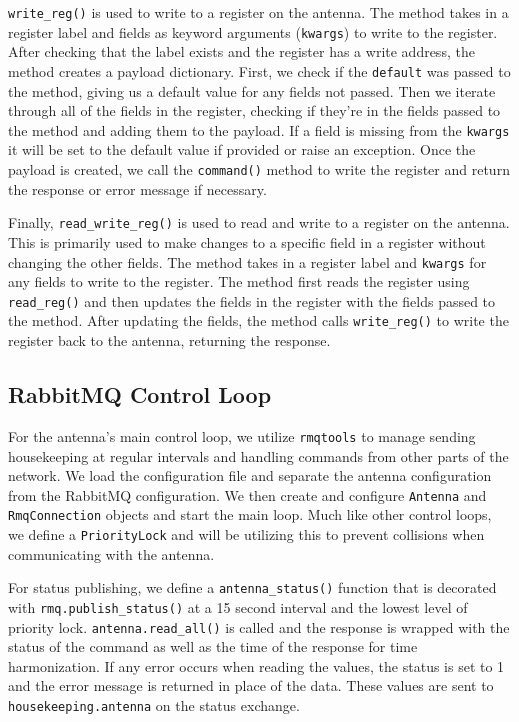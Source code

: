 \texttt{write\_reg()} is used to write to a register on the antenna.
The method takes in a register label and fields as keyword arguments (\texttt{kwargs}) to write to the register.
After checking that the label exists and the register has a write address, the method creates a payload dictionary. 
First, we check if the \texttt{default}  was passed to the method, giving us a default value for any fields not passed.
Then we iterate through all of the fields in the register, checking if they're in the fields passed to the method and adding them to the payload.
If a field is missing from the \texttt{kwargs} it will be set to the default value if provided or raise an exception. 
Once the payload is created, we call the \texttt{command()} method to write the register and return the response or error message if necessary. 

Finally, \texttt{read\_write\_reg()} is used to read and write to a register on the antenna.
This is primarily used to make changes to a specific field in a register without changing the other fields.
The method takes in a register label and \texttt{kwargs} for any fields to write to the register.
The method first reads the register using \texttt{read\_reg()} and then updates the fields in the register with the fields passed to the method.
After updating the fields, the method calls \texttt{write\_reg()} to write the register back to the antenna, returning the response. 

\subsection{RabbitMQ Control Loop}
For the antenna's main control loop, we utilize \texttt{rmqtools} to manage sending housekeeping at regular intervals and handling commands from other parts of the network.
We load the configuration file and separate the antenna configuration from the RabbitMQ configuration.
We then create and configure \texttt{Antenna} and \texttt{RmqConnection} objects and start the main loop.
Much like other control loops, we define a \texttt{PriorityLock} and will be utilizing this to prevent collisions when communicating with the antenna. 

For status publishing, we define a \texttt{antenna\_status()} function that is decorated with \texttt{rmq.publish\_status()} at a 15 second interval and the lowest level of priority lock. 
\texttt{antenna.read\_all()} is called and the response is wrapped with the status of the command as well as the time of the response for time harmonization.
If any error occurs when reading the values, the status is set to 1 and the error message is returned in place of the data.
These values are sent to \texttt{housekeeping.antenna} on the status exchange.


